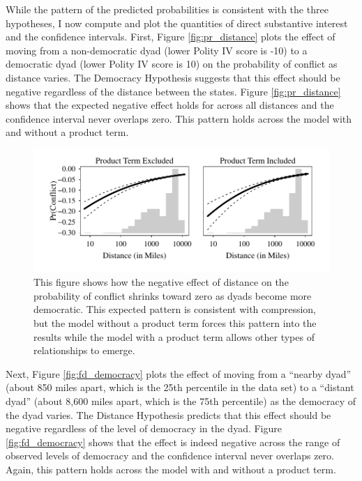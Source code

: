 \documentclass[12pt]{article}
\begin{document}
While the pattern of the predicted probabilities is consistent with the three hypotheses, I now compute and plot the quantities of direct substantive interest and the confidence intervals. First, Figure \ref{fig:pr_distance} plots the effect of moving from a non-democratic dyad (lower Polity IV score is -10) to a democratic dyad (lower Polity IV score is 10) on the probability of conflict as distance varies. The Democracy Hypothesis suggests that this effect should be negative regardless of the distance between the states. Figure \ref{fig:pr_distance} shows that the expected negative effect holds for across all distances and the confidence interval never overlaps zero. This pattern holds across the model with and without a product term.

        \begin{figure}[H]
        \begin{center}
        \includegraphics[scale = .8]{fig/fd_distance.pdf}
        \end{center}\caption{This figure shows how the negative effect of distance on the probability of conflict shrinks toward zero as dyads become more democratic. This expected pattern is consistent with compression, but the model without a product term forces this pattern into the results while the model with a product term allows other types of relationships to emerge.}\label{fig:fd_distance}
        \end{figure}

Next, Figure \ref{fig:fd_democracy} plots the effect of moving from a ``nearby dyad'' (about 850 miles apart, which is the 25th percentile in the data set) to a ``distant dyad'' (about 8,600 miles apart, which is the 75th percentile) as the democracy of the dyad varies. The Distance Hypothesis predicts that this effect should be negative regardless of the level of democracy in the dyad. Figure \ref{fig:fd_democracy} shows that the effect is indeed negative across the range of observed levels of democracy and the confidence interval never overlaps zero. Again, this pattern holds across the model with and without a product term.
        
\end{document}

